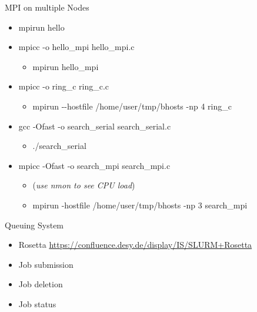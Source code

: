\documentclass[ignorenonframetext,]{beamer}
\providecommand{\tightlist}{%
  \setlength{\itemsep}{0pt}\setlength{\parskip}{0pt}}
\begin{document}
\begin{frame}{MPI on multiple Nodes}


\begin{itemize}
\tightlist
\item
  mpirun hello
\end{itemize}


\begin{itemize}
\tightlist
\item
  mpicc -o hello\_mpi hello\_mpi.c

  \begin{itemize}
  \tightlist
  \item
    mpirun hello\_mpi
  \end{itemize}

\item
  mpicc -o ring\_c ring\_c.c

  \begin{itemize}
  \tightlist
  \item
    mpirun -\/-hostfile /home/user/tmp/bhosts -np 4 ring\_c
  \end{itemize}

\item
  gcc -Ofast -o search\_serial search\_serial.c

  \begin{itemize}
  \tightlist
  \item
    ./search\_serial
  \end{itemize}

\item
  mpicc -Ofast -o search\_mpi search\_mpi.c

  \begin{itemize}
  \tightlist
  \item
    (\emph{use nmon to see CPU load})
  \item
    mpirun -hostfile /home/user/tmp/bhosts -np 3 search\_mpi
  \end{itemize}

\end{itemize}


\end{frame}

\begin{frame}{Queuing System}

\begin{itemize}
\tightlist
\item
  Rosetta \url{https://confluence.desy.de/display/IS/SLURM+Rosetta}
\item
  Job submission
\item
  Job deletion
\item
  Job status
\end{itemize}


\end{frame}
\end{document}

